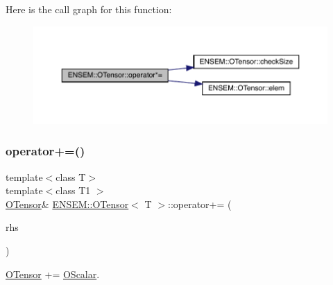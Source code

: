Here is the call graph for this function\+:
\nopagebreak
\begin{figure}[H]
\begin{center}
\leavevmode
\includegraphics[width=350pt]{da/d8a/classENSEM_1_1OTensor_a6edba72b265fa3629417ad85c9ae1477_cgraph}
\end{center}
\end{figure}
\mbox{\label{classENSEM_1_1OTensor_a93fe0d4638104ad0f6bdaf5de7760276}} 
\subsubsection{\texorpdfstring{operator+=()}{operator+=()}\hspace{0.1cm}{\footnotesize\ttfamily [1/6]}}
{\footnotesize\ttfamily template$<$class T$>$ \\
template$<$class T1 $>$ \\
\mbox{\hyperlink{classENSEM_1_1OTensor}{O\+Tensor}}\& \mbox{\hyperlink{classENSEM_1_1OTensor}{E\+N\+S\+E\+M\+::\+O\+Tensor}}$<$ T $>$\+::operator+= (\begin{DoxyParamCaption}\item[{const \mbox{\hyperlink{classENSEM_1_1OScalar}{O\+Scalar}}$<$ T1 $>$ \&}]{rhs }\end{DoxyParamCaption})\hspace{0.3cm}{\ttfamily [inline]}}



\mbox{\hyperlink{classENSEM_1_1OTensor}{O\+Tensor}} += \mbox{\hyperlink{classENSEM_1_1OScalar}{O\+Scalar}}. 

